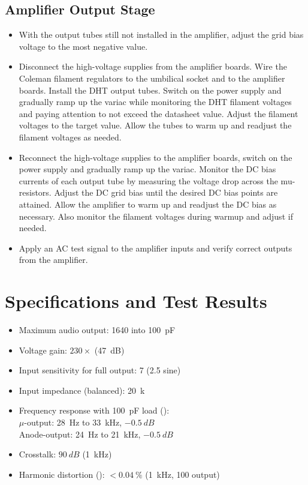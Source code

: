 \subsection{Amplifier Output Stage}
\begin{itemize}
\item With the output tubes still not installed in the amplifier, adjust the grid bias voltage to the most negative value.
\item Disconnect the high-voltage supplies from the amplifier boards. Wire the Coleman filament regulators to the umbilical socket and to the amplifier boards. Install the DHT output tubes. Switch on the power supply and gradually ramp up the variac while monitoring the DHT filament voltages and paying attention to not exceed the datasheet value. Adjust the filament voltages to the target value. Allow the tubes to warm up and readjust the filament voltages as needed.
\item Reconnect the high-voltage supplies to the amplifier boards, switch on the power supply and gradually ramp up the variac. Monitor the DC bias currents of each output tube by measuring the voltage drop across the mu-resistors. Adjust the DC grid bias until the desired DC bias points are attained. Allow the amplifier to warm up and readjust the DC bias as necessary. Also monitor the filament voltages during warmup and adjust if needed.
\item Apply an AC test signal to the amplifier inputs and verify correct outputs from the amplifier.

\end{itemize}


\section{Specifications and Test Results}

\begin{itemize}
  \item Maximum audio output: \SI{1640}{\unitVpp} into \SI{100}{pF}
  \item Voltage gain: $230 \times$ (\SI{47}{dB})
  \item Input sensitivity for full output: \SI{7}{\unitVpp} (\SI{2.5}{\unitVrms} sine)
  \item Input impedance (balanced): \SI{20}{k\Ohm}
  \item Frequency response with \SI{100}{pF} load ():\\
        $\mu$-output: \SI{28}{Hz} to \SI{33}{kHz}, $-\SI{0.5}{dB}$\\
        Anode-output: \SI{24}{Hz} to \SI{21}{kHz}, $-\SI{0.5}{dB}$
  \item Crosstalk: $\SI{90}{dB}$ (\SI{1}{kHz})
  \item Harmonic distortion (): $< \SI{0.04}{\%}$ (\SI{1}{kHz}, \SI{100}{\unitVrms} output)
\end{itemize}

